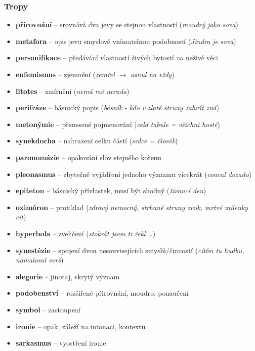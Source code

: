 \documentclass[10pt,a4paper]{article}
\begin{document}
\subsubsection{Tropy}
\begin{itemize}
\item[] \textbf{přirovnání} -- srovnává dva jevy se stejnou vlastností (\textit{moudrý jako sova})
\item[] \textbf{metafora} -- opis jevu smyslově vnímatelnou podobností (\textit{Jindra je sova})
\item[] \textbf{personifikace} -- předávání vlastností živých bytostí na neživé věci
\item[] \textbf{eufemismus} -- zjemnění (\textit{zemřel $\rightarrow$ usnul na vždy})
\item[] \textbf{litotes} -- zmírnění (\textit{nemá mě nerada})
\item[] \textbf{perifráze} -- básnický popis (\textit{básník - kdo v zlaté struny zahrát zná})
\item[] \textbf{metonýmie} -- přenesené pojmenování (\textit{celá tabule = všichni hosté})
\item[] \textbf{synekdocha} -- nahrazení celku částí (\textit{srdce = člověk})
\item[] \textbf{paronomázie} -- opakování slov stejného kořenu
\item[] \textbf{pleonasmus} -- zbytečné vyjádření jednoho významu vícekrát (\textit{couval dozadu})
\item[] \textbf{epiteton} -- básnický přívlastek, musí být shodný (\textit{živoucí den})
\item[] \textbf{oximóron} -- protiklad (\textit{zdravý nemocný, strhané struny zvuk, mrtvé milenky cit})
\item[] \textbf{hyperbola} -- zveličení (\textit{stokrát jsem ti řekl \ldots})
\item[] \textbf{synestézie} -- spojení dvou nesouvisejících smyslů/činností (\textit{cítím tu hudbu, namaloval verš})
\item[] \textbf{alegorie} -- jinotaj, skrytý význam
\item[] \textbf{podobenství} -- rozšířené přirovnání, moudro, ponaučení
\item[] \textbf{symbol} -- zastoupení
\item[] \textbf{ironie} -- opak, záleží na intonaci, kontextu
\item[] \textbf{sarkasmus} -- vyostření ironie
\end{itemize}
\end{document}
